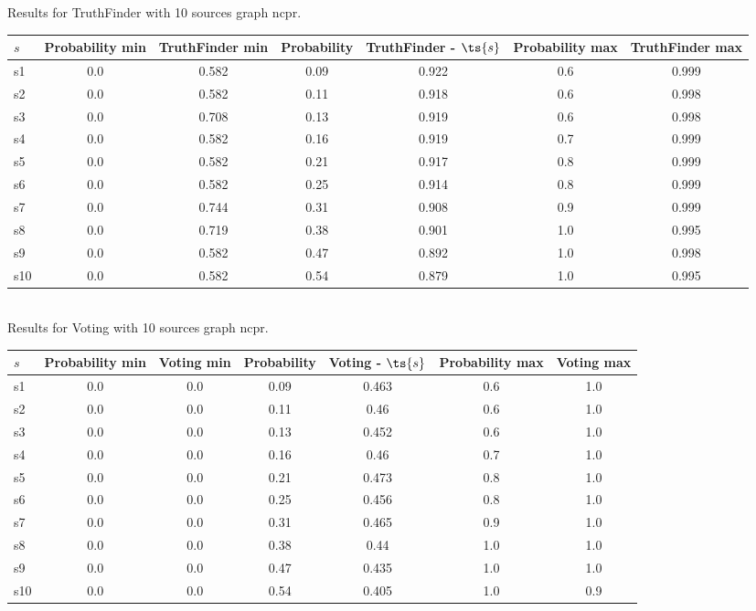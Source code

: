 \documentclass{article}
\begin{document}
\noindent Results for TruthFinder with 10 sources graph ncpr.

\noindent\begin{tabular}{|l|c|c|c|c|c|c|}
\hline
$s$& Probability min & TruthFinder min & Probability & TruthFinder - $\ts{s}$ & Probability max & TruthFinder max\\
\hline
s1 &0.0 & 0.582 & 0.09 & 0.922 & 0.6 & 0.999\\
\hline
s2 &0.0 & 0.582 & 0.11 & 0.918 & 0.6 & 0.998\\
\hline
s3 &0.0 & 0.708 & 0.13 & 0.919 & 0.6 & 0.998\\
\hline
s4 &0.0 & 0.582 & 0.16 & 0.919 & 0.7 & 0.999\\
\hline
s5 &0.0 & 0.582 & 0.21 & 0.917 & 0.8 & 0.999\\
\hline
s6 &0.0 & 0.582 & 0.25 & 0.914 & 0.8 & 0.999\\
\hline
s7 &0.0 & 0.744 & 0.31 & 0.908 & 0.9 & 0.999\\
\hline
s8 &0.0 & 0.719 & 0.38 & 0.901 & 1.0 & 0.995\\
\hline
s9 &0.0 & 0.582 & 0.47 & 0.892 & 1.0 & 0.998\\
\hline
s10 &0.0 & 0.582 & 0.54 & 0.879 & 1.0 & 0.995\\
\hline
\end{tabular}\\

\noindent Results for Voting with 10 sources graph ncpr.

\noindent\begin{tabular}{|l|c|c|c|c|c|c|}
\hline
$s$& Probability min & Voting min & Probability & Voting - $\ts{s}$ & Probability max & Voting max\\
\hline
s1 &0.0 & 0.0 & 0.09 & 0.463 & 0.6 & 1.0\\
\hline
s2 &0.0 & 0.0 & 0.11 & 0.46 & 0.6 & 1.0\\
\hline
s3 &0.0 & 0.0 & 0.13 & 0.452 & 0.6 & 1.0\\
\hline
s4 &0.0 & 0.0 & 0.16 & 0.46 & 0.7 & 1.0\\
\hline
s5 &0.0 & 0.0 & 0.21 & 0.473 & 0.8 & 1.0\\
\hline
s6 &0.0 & 0.0 & 0.25 & 0.456 & 0.8 & 1.0\\
\hline
s7 &0.0 & 0.0 & 0.31 & 0.465 & 0.9 & 1.0\\
\hline
s8 &0.0 & 0.0 & 0.38 & 0.44 & 1.0 & 1.0\\
\hline
s9 &0.0 & 0.0 & 0.47 & 0.435 & 1.0 & 1.0\\
\hline
s10 &0.0 & 0.0 & 0.54 & 0.405 & 1.0 & 0.9\\
\hline
\end{tabular}\\
\end{document}
